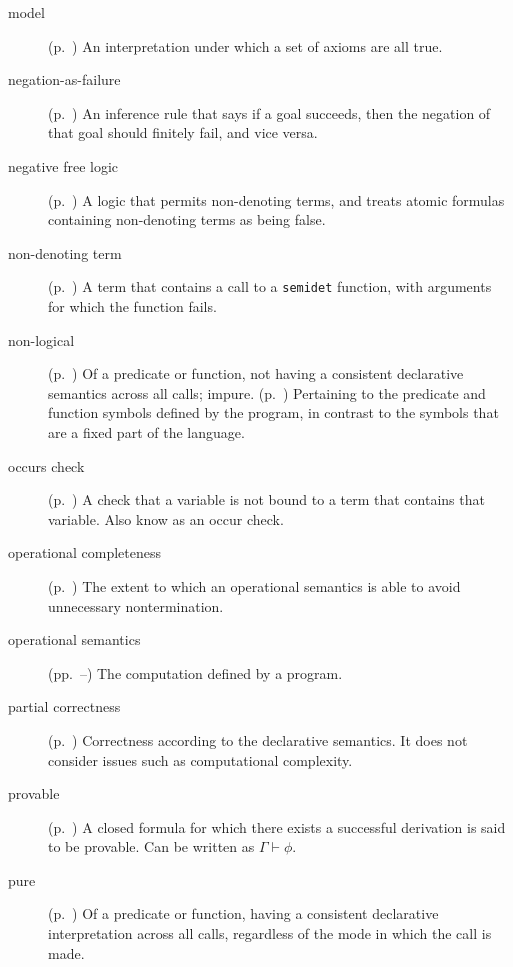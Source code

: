 \begin{description}
\item[model]
(p.~\pageref{gi:model})
An interpretation under which a set of axioms are all true.

\item[negation-as-failure]
(p.~\pageref{sec:naf})
An inference rule that says
if a goal succeeds, then the negation of that goal should finitely fail,
and vice versa.

\item[negative free logic]
(p.~\pageref{gi:nfl})
A logic that permits non-denoting terms,
and treats atomic formulas containing non-denoting terms as being false.

\item[non-denoting term]
(p.~\pageref{gi:non-denoting})
A term that contains a call to a \texttt{semidet} function,
with arguments for which the function fails.

\item[non-logical]
(p.~\pageref{gi:non-logical})
Of a predicate or function,
not having a consistent declarative semantics across all calls; impure.
(p.~\pageref{gi:non-logical2})
Pertaining to the predicate and function symbols defined by the program,
in contrast to the symbols that are a fixed part of the language.

\item[occurs check]
(p.~\pageref{gi:occurs-check})
A check that a variable is not bound to a term that contains that variable.
Also know as an occur check.

\item[operational completeness]
(p.~\pageref{sec:incompleteness})
The extent to which an operational semantics
is able to avoid unnecessary nontermination.

\item[operational semantics]
(pp.~\pageref{sec:op-sem}--\pageref{end:op-sem})
The computation defined by a program.

\item[partial correctness]
(p.~\pageref{gi:partial-correctness})
Correctness according to the declarative semantics.
It does not consider issues such as computational complexity.

\item[provable]
(p.~\pageref{gi:provable})
A closed formula for which there exists a successful derivation
is said to be provable.
Can be written as $\Gamma \vdash \phi$.

\item[pure]
(p.~\pageref{gi:pure})
Of a predicate or function,
having a consistent declarative interpretation across all calls,
regardless of the mode in which the call is made.


\end{description}
